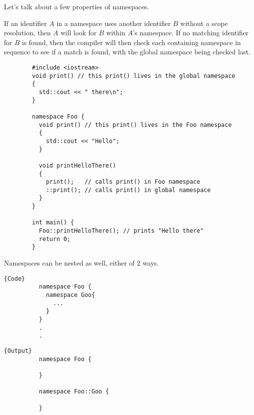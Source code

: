\documentclass{article}
\begin{document}
    Let's talk about a few properties of namespaces. 

    \begin{lemma}
      If an identifier $A$ in a namespace uses another identifier $B$ without a scope resolution, then $A$ will look for $B$ within $A$'s namespace. If no matching identifier for $B$ is found, then the compiler will then check each containing namespace in sequence to see if a match is found, with the global namespace being checked last. 

      \begin{lstlisting}
        #include <iostream>
        void print() // this print() lives in the global namespace
        {
          std::cout << " there\n";
        }

        namespace Foo {
          void print() // this print() lives in the Foo namespace
          {
            std::cout << "Hello";
          }

          void printHelloThere()
          {
            print();   // calls print() in Foo namespace
            ::print(); // calls print() in global namespace
          }
        }

        int main() {
          Foo::printHelloThere(); // prints "Hello there" 
          return 0;
        } 
      \end{lstlisting}
    \end{lemma}

    \begin{lemma}
      Namespaces can be nested as well, either of 2 ways. 

      \noindent\begin{minipage}{.5\textwidth}
        \begin{lstlisting}[]{Code}
          namespace Foo {
            namespace Goo{
              ... 
            }
          }
          .
          .
        \end{lstlisting}
        \end{minipage}
        \hfill
        \begin{minipage}{.49\textwidth}
        \begin{lstlisting}[]{Output}
          namespace Foo {

          }

          namespace Foo::Goo {

          }
        \end{lstlisting}
      \end{minipage}
    \end{lemma}
\end{document}
